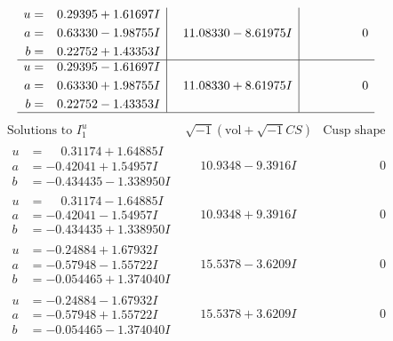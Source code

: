 \documentclass[1p]{elsarticle_modified}
\theoremstyle{definition}
\newcommand{\I}{\sqrt{-1}}
\begin{document}
$$\begin{array}{c|c|c}
\begin{aligned}
u &= \phantom{-}0.29395 + 1.61697 I \\
a &= \phantom{-}0.63330 - 1.98755 I \\
b &= \phantom{-}0.22752 + 1.43353 I\end{aligned}
 & \phantom{-}11.08330 - 8.61975 I & \phantom{-0.000000 } 0 \\ \hline\begin{aligned}
u &= \phantom{-}0.29395 - 1.61697 I \\
a &= \phantom{-}0.63330 + 1.98755 I \\
b &= \phantom{-}0.22752 - 1.43353 I\end{aligned}
 & \phantom{-}11.08330 + 8.61975 I & \phantom{-0.000000 } 0\\
 \hline 
 \end{array}$$\newpage$$\begin{array}{c|c|c}  
\text{Solutions to }I^u_{1}& \I (\text{vol} + \sqrt{-1}CS) & \text{Cusp shape}\\
 \hline 
\begin{aligned}
u &= \phantom{-}0.31174 + 1.64885 I \\
a &= -0.42041 + 1.54957 I \\
b &= -0.434435 - 1.338950 I\end{aligned}
 & \phantom{-}10.9348 - 9.3916 I & \phantom{-0.000000 } 0 \\ \hline\begin{aligned}
u &= \phantom{-}0.31174 - 1.64885 I \\
a &= -0.42041 - 1.54957 I \\
b &= -0.434435 + 1.338950 I\end{aligned}
 & \phantom{-}10.9348 + 9.3916 I & \phantom{-0.000000 } 0 \\ \hline\begin{aligned}
u &= -0.24884 + 1.67932 I \\
a &= -0.57948 - 1.55722 I \\
b &= -0.054465 + 1.374040 I\end{aligned}
 & \phantom{-}15.5378 - 3.6209 I & \phantom{-0.000000 } 0 \\ \hline\begin{aligned}
u &= -0.24884 - 1.67932 I \\
a &= -0.57948 + 1.55722 I \\
b &= -0.054465 - 1.374040 I\end{aligned}
 & \phantom{-}15.5378 + 3.6209 I & \phantom{-0.000000 } 0 \\ \hline\begin{aligned}

\end{aligned}
\end{array}$$
\end{document}
